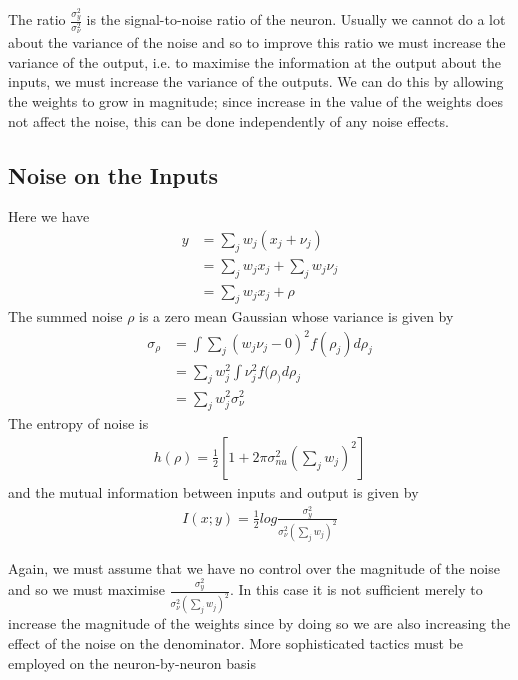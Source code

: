 \documentclass[../../main.tex]{subfiles}
\numberwithin{equation}{section}
\begin{document}
The ratio $\frac{\sigma_y^2}{\sigma_{\nu}^2}$ is the signal-to-noise ratio of the neuron. Usually we cannot do a lot about the variance of the noise and so to improve this ratio we must increase the variance of the output, i.e. to maximise the information at the output about the inputs, we must increase the variance of the outputs. We can do this by allowing the weights to grow in magnitude; since increase in the value of the weights does not affect the noise, this can be done independently of any noise effects.

\subsection{Noise on the Inputs}
Here we have
\begin{align*}
    y&=\sum\limits_j w_j(x_j+\nu_j)\\
    &=\sum\limits_j w_jx_j + \sum\limits_j w_j\nu_j\\
    &=\sum\limits_j w_jx_j + \rho
\end{align*}
The summed noise $\rho$ is a zero mean Gaussian  whose variance is given by
\begin{align*}
    \sigma_{\rho}&=\int \sum\limits_j (w_j\nu_j-0)^2f(\rho_j)d\rho_j\\
    &=\sum\limits_jw_j^2\int\nu_j^2f(\rho_)d\rho_j\\
    &=\sum\limits_j w_j^2\sigma_{\nu}^2
\end{align*}
The entropy of noise is 
\begin{align}
    h(\rho)=\frac{1}{2}[1 + 2\pi\sigma_{nu}^2(\sum\limits_j w_j)^2]
\end{align}
and the mutual information between inputs and output is given by
\begin{align}
    I(x;y)=\frac{1}{2}log\frac{\sigma_y^2}{\sigma_{\nu}^2(\sum\limits_j w_j)^2}
\end{align}

Again, we must assume that we have no control over the magnitude of the noise and so we must maximise $\frac{\sigma_y^2}{\sigma_{\nu}^2(\sum\limits_j w_j)^2}$. In this case it is not sufficient merely to increase the magnitude of the weights since by doing so we are also increasing the effect of the noise on the denominator. More sophisticated tactics must be employed on the neuron-by-neuron basis 
\end{document}
